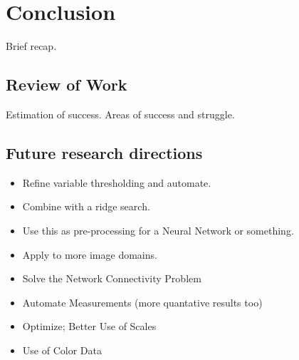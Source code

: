 
\chapter{Conclusion}

Brief recap.

\section{Review of Work}

Estimation of success. Areas of success and struggle.

\section{Future research directions} \label{sec:conclusion.future-research}

\begin{itemize}
	\item Refine variable thresholding and automate.
	\item Combine with a ridge search.
	\item Use this as pre-processing for a Neural Network or something.
	\item Apply to more image domains.
	\item Solve the Network Connectivity Problem
	\item Automate Measurements (more quantative results too)
	\item Optimize; Better Use of Scales
	\item Use of Color Data
\end{itemize}

